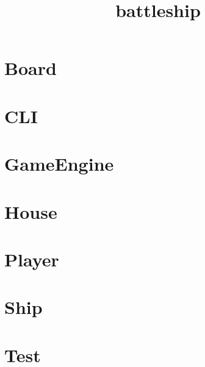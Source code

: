 \documentclass{article}
\begin{document}
\title{battleship}
\maketitle
\tableofcontents

\section{Board}

\section{CLI}

\section{GameEngine}

\section{House}

\section{Player}

\section{Ship}

\section{Test}

\end{document}
